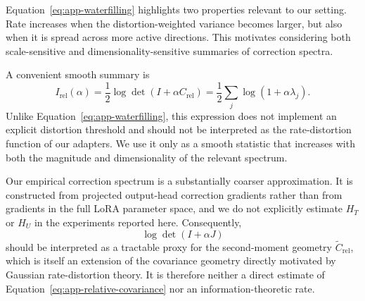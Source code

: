 Equation~\ref{eq:app-waterfilling} highlights two properties relevant to our
setting.
Rate increases when the distortion-weighted variance becomes larger, but also
when it is spread across more active directions.
This motivates considering both scale-sensitive and
dimensionality-sensitive summaries of correction spectra.

A convenient smooth summary is
\begin{equation}
    I_{\mathrm{rel}}(\alpha)
    =
    \frac{1}{2}
    \log\det
    \left(
        I+\alpha C_{\mathrm{rel}}
    \right)
    =
    \frac{1}{2}
    \sum_j
    \log(1+\alpha\lambda_j).
    \label{eq:app-soft-logdet}
\end{equation}
Unlike Equation~\ref{eq:app-waterfilling}, this expression does not implement
an explicit distortion threshold and should not be interpreted as the
rate-distortion function of our adapters.
We use it only as a smooth statistic that increases with both the magnitude
and dimensionality of the relevant spectrum.

Our empirical correction spectrum is a substantially coarser approximation.
It is constructed from projected output-head correction gradients rather than
from gradients in the full LoRA parameter space, and we do not explicitly
estimate $H_T$ or $H_U$ in the experiments reported here.
Consequently,
\[
    \log\det(I+\alpha J)
\]
should be interpreted as a tractable proxy for the second-moment geometry
$\widetilde C_{\mathrm{rel}}$, which is itself an extension of the covariance
geometry directly motivated by Gaussian rate-distortion theory.
It is therefore neither a direct estimate of
Equation~\ref{eq:app-relative-covariance} nor an information-theoretic rate.